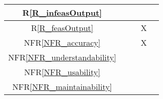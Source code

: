 \documentclass[12pt]{article}
\newcommand{\rref}[1]{R\ref{#1}}
\newcommand{\nfrref}[1]{NFR\ref{#1}}
\begin{document}
\begin{table}[h!]
\begin{tabular}{|c|c|c|c|c|}
    \rref{R_infeasOutput}          &                &                 &                &                           \\ \hline %
    \rref{R_feasOutput}            &                &                 & X              &                           \\ \hline %
    \nfrref{NFR_accuracy}          &                &                 & X              &                           \\ \hline %
    \nfrref{NFR_understandability} &                &                 &                &                           \\ \hline %
    \nfrref{NFR_usability}         &                &                 &                &                           \\ \hline %
    \nfrref{NFR_maintainability}   &                &                 &                &                           \\ \hline %

\end{tabular}
\end{table}
\end{document}

